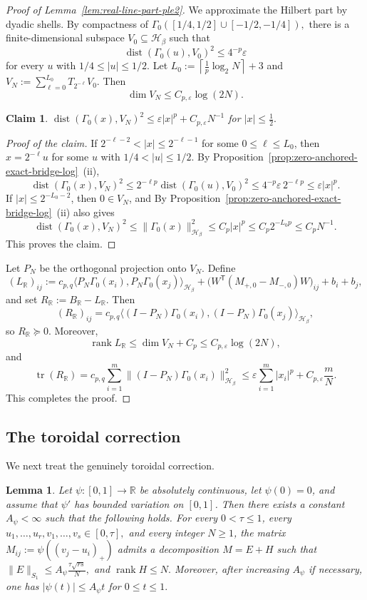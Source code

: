 \documentclass[11pt]{article}
\newtheorem{lemma}[theorem]{Lemma}
\newtheorem{claim}[theorem]{Claim}
\theoremstyle{definition}
\newenvironment{poc}{\begin{proof}[Proof of the claim]\renewcommand*{\qedsymbol}{$\blacksquare$}}{\end{proof}}
\newcommand{\R}{\mathbb R}
\begin{document}
\begin{proof}[Proof of Lemma~\ref{lem:real-line-part-ple2}]
We approximate the Hilbert part by dyadic shells. By compactness of \( \Gamma_0([1/4,1/2]\cup[-1/2,-1/4]),\) there is a finite-dimensional subspace \(V_0\subseteq\mathcal H_\beta\) such that \[ \operatorname{dist}(\Gamma_0(u),V_0)^2\le 4^{-p}\varepsilon \] for every \(u\) with \(1/4\le |u|\le1/2\). Let \(L_0:=\left\lceil\frac1p\log_2N\right\rceil+3\) and \(V_N:=\sum_{\ell=0}^{L_0}T_{2^{-\ell}}V_0.\) Then \[ \dim V_N\le C_{p,\varepsilon}\log(2N). \]
\begin{claim}
    \(\operatorname{dist}(\Gamma_0(x),V_N)^2 \le \varepsilon |x|^p+C_{p,\varepsilon}N^{-1}\) for \(|x|\le\frac{1}{2}.\)
\end{claim}
\begin{poc}
    If \(2^{-\ell-2}<|x|\le 2^{-\ell-1}\) for some \(0\le \ell\le L_0\), then \(x=2^{-\ell}u\) for some \(u\) with \(1/4<|u|\le1/2\). By Proposition~\ref{prop:zero-anchored-exact-bridge-log}~(ii), \[ \operatorname{dist}(\Gamma_0(x),V_N)^2 \le 2^{-\ell p}\operatorname{dist}(\Gamma_0(u),V_0)^2 \le 4^{-p}\varepsilon\,2^{-\ell p} \le \varepsilon |x|^p. \] If \(|x|\le 2^{-L_0-2}\), then \(0\in V_N\), and By Proposition~\ref{prop:zero-anchored-exact-bridge-log}~(ii) also gives \[ \operatorname{dist}(\Gamma_0(x),V_N)^2 \le \|\Gamma_0(x)\|_{\mathcal H_\beta}^2 \le C_p |x|^p \le C_{p}2^{-L_0p} \le C_{p}N^{-1}. \] This proves the claim.
\end{poc}

Let \(P_N\) be the orthogonal projection onto \(V_N\). Define
\[
(L_{\R})_{ij}
:=
c_{p,q}\langle P_N\Gamma_0(x_i),P_N\Gamma_0(x_j)\rangle_{\mathcal H_\beta}
+
\bigl(W^{\mathsf T}(M_{+,0}-M_{-,0})W\bigr)_{ij}
+
b_i+b_j,
\]
and set
\(
R_{\R}:=B_{\R}-L_{\R}.
\)
Then
\[
(R_{\R})_{ij}
=
c_{p,q}
\langle (I-P_N)\Gamma_0(x_i),(I-P_N)\Gamma_0(x_j)\rangle_{\mathcal H_\beta},
\]
so \(R_{\R}\succeq0\). Moreover,
\[
\operatorname{rank}L_{\R}
\le
\dim V_N+C_p
\le
C_{p,\varepsilon}\log(2N),
\]
and
\[
\operatorname{tr}(R_{\R})
=
c_{p,q}\sum_{i=1}^m
\|(I-P_N)\Gamma_0(x_i)\|_{\mathcal H_\beta}^2
\le
\varepsilon\sum_{i=1}^m |x_i|^p
+
C_{p,\varepsilon}\frac{m}{N}.
\]
This completes the proof.
\end{proof}

\subsection{The toroidal correction}

We next treat the genuinely toroidal correction.

\begin{lemma}\label{lem:volterra}
Let \(\psi:[0,1]\to\R\) be absolutely continuous, let \(\psi(0)=0\), and assume
that \(\psi'\) has bounded variation on \([0,1]\). Then there exists a constant
\(A_\psi<\infty\) such that the following holds. For every \(0<\tau\le1\),
every
\(
u_1,\dots,u_r, v_1,\dots,v_s\in[0,\tau],
\)
and every integer \(N\ge1\), the matrix
\(
M_{ij}:=\psi((v_j-u_i)_+)
\)
admits a decomposition
\(
M=E+H
\)
such that
\(
\|E\|_{S_1}\le A_\psi\frac{\tau\sqrt{rs}}{N},
\)
and
\(
\operatorname{rank}H\le N.
\)
Moreover, after increasing \(A_\psi\) if necessary, one has
\(
|\psi(t)|\le A_\psi t\) for
\( 0\le t\le 1.
\)
\end{lemma}
\end{document}
